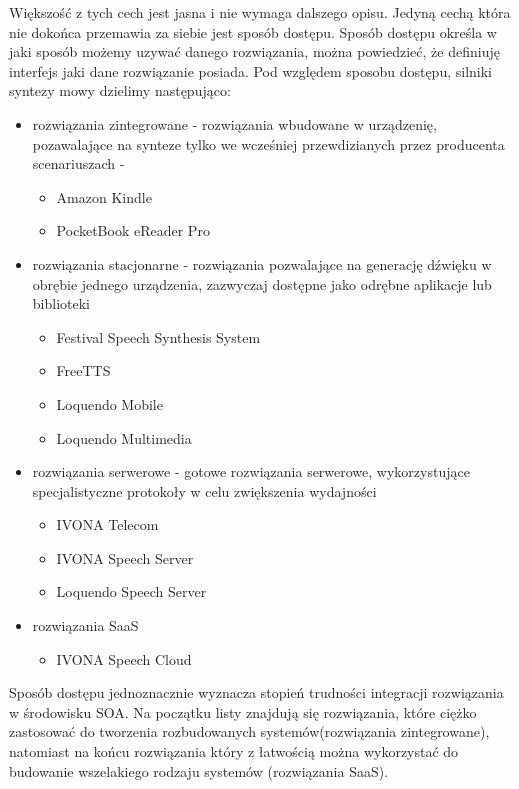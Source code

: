 Większość z tych cech jest jasna i nie wymaga dalszego opisu. Jedyną cechą która nie dokońca przemawia za siebie jest sposób dostępu. Sposób dostępu określa w jaki sposób możemy uzywać danego rozwiązania, można powiedzieć, że definiuję interfejs jaki dane rozwiązanie posiada. Pod względem sposobu dostępu, silniki syntezy mowy dzielimy następująco:

\begin{itemize}
	\item rozwiązania zintegrowane  - rozwiązania wbudowane w urządzenię, pozawalające na synteze tylko we wcześniej przewdizianych przez producenta scenariuszach - 
		\begin{itemize}
			\item  Amazon Kindle
			\item  PocketBook eReader Pro
		\end{itemize}
	\item rozwiązania stacjonarne - rozwiązania pozwalające na generację dźwięku w obrębie jednego urządzenia, zazwyczaj dostępne jako odrębne aplikacje lub biblioteki
		\begin{itemize}
			\item Festival Speech Synthesis System
			\item FreeTTS
			\item Loquendo Mobile
			\item Loquendo Multimedia
		\end{itemize}
	\item rozwiązania serwerowe - gotowe rozwiązania serwerowe, wykorzystujące specjalistyczne protokoły w celu zwiększenia wydajności 
		\begin{itemize}
			\item IVONA Telecom
			\item IVONA Speech Server
			\item Loquendo Speech Server
		\end{itemize}
	\item rozwiązania SaaS
		\begin{itemize}
			\item IVONA Speech Cloud
		\end{itemize}
\end{itemize}

Sposób dostępu jednoznacznie wyznacza stopień trudności integracji rozwiązania w środowisku SOA. Na początku listy znajdują się rozwiązania, które ciężko zastosować do tworzenia rozbudowanych systemów(rozwiązania zintegrowane), natomiast na końcu rozwiązania który z łatwością można wykorzystać do budowanie wszelakiego rodzaju systemów (rozwiązania SaaS).

